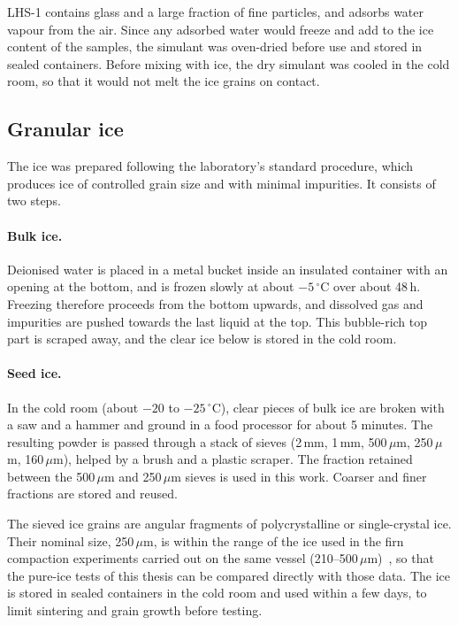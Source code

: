 LHS-1 contains glass and a large fraction of fine particles, and adsorbs water vapour from the air. Since any adsorbed water would freeze and add to the ice content of the samples, the simulant was oven-dried before use and stored in sealed containers.
Before mixing with ice, the dry simulant was cooled in the cold room, so that it would not melt the ice grains on contact.

\subsection{Granular ice}
\label{subsec:ice}

The ice was prepared following the laboratory's standard procedure, which produces ice of controlled grain size and with minimal impurities. It consists of two steps.

\paragraph{Bulk ice.} Deionised water is placed in a metal bucket inside an insulated container with an opening at the bottom, and is frozen slowly at about $-5\,^\circ$C over about 48\,h. Freezing therefore proceeds from the bottom upwards, and dissolved gas and impurities are pushed towards the last liquid at the top. This bubble-rich top part is scraped away, and the clear ice below is stored in the cold room.

\paragraph{Seed ice.} In the cold room (about $-20$ to $-25\,^\circ$C), clear pieces of bulk ice are broken with a saw and a hammer and ground in a food processor for about 5 minutes. The resulting powder is passed through a stack of sieves (2\,mm, 1\,mm, 500\,$\mu$m, 250\,$\mu$m, 160\,$\mu$m), helped by a brush and a plastic scraper. The fraction retained between the 500\,$\mu$m and 250\,$\mu$m sieves is used in this work. Coarser and finer fractions are stored and reused.

The sieved ice grains are angular fragments of polycrystalline or single-crystal ice. Their nominal size, 250\,$\mu$m, is within the range of the ice used in the firn compaction experiments carried out on the same vessel (210--500\,$\mu$m)~\cite{skarbek2025data}, so that the pure-ice tests of this thesis can be compared directly with those data. The ice is stored in sealed containers in the cold room and used within a few days, to limit sintering and grain growth before testing.

